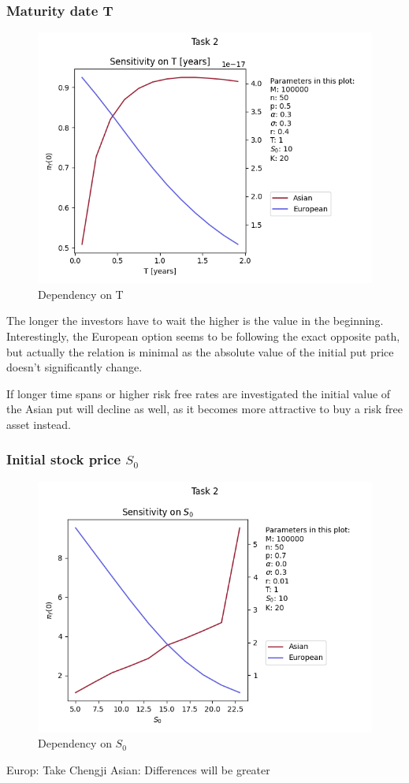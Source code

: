 \subsubsection{Maturity date T}
\begin{figure}[!h]
    \centering
    \includegraphics[width=0.7\linewidth]{pictures/task2_T.png}
    \caption{Dependency on T}
    \label{fig:task2_T}
\end{figure}


The longer the investors have to wait the higher is the value in the beginning.
Interestingly, the European option seems to be following the exact opposite path, but actually the relation is minimal as the absolute value of the initial put price doesn’t significantly change.

If longer time spans or higher risk free rates are investigated the initial value of the Asian put will decline as well, as it becomes more attractive to buy a risk free asset instead.

\newpage
\subsubsection{Initial stock price $S_0$}
\begin{figure}[!h]
    \centering
    \includegraphics[width=0.7\linewidth]{pictures/task2_S_0.png}
    \caption{Dependency on $S_0$}
    \label{fig:task2_S_0}
\end{figure}

Europ: Take Chengji
Asian: Differences will be greater
